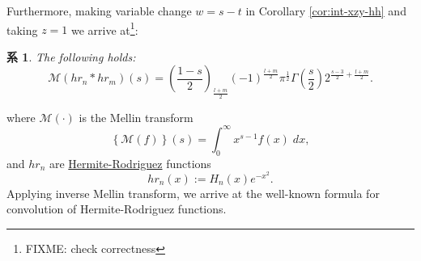 \documentclass[pdf,notes]{beamer}
\newtheorem{cor}{系}
\begin{document}
\begin{frame}
	Furthermore, making variable change $w=s-t$ in Corollary \ref{cor:int-xzy-hh} and taking $z=1$ we arrive at\footnote[frame]{FIXME: check correctness}:
	\begin{cor}
		The following holds:
		\begin{equation}
			\mathcal{M}(hr_n\ast hr_m)(s)=
			\left(  \frac{1-s}{2}\right)_{\frac{l + m}{2}} (- 1)^{\frac{l
			+ m}{2}}  \pi^{\frac{1}{2}} \Gamma \left( \frac{s}{2} \right)
			2^{\frac{s-3}{2} + \frac{l + m}{2}}.
			\label{eqn:mellin-hh}
		\end{equation}
	\end{cor}
	where $\mathcal{M}(\cdot)$ is the Mellin transform\begin{equation*}
		\left\{ \mathcal{M}(f) \right\}(s)=\int_0^\infty x^{s-1}f(x)\;dx,
	\end{equation*}
	and $hr_n$ are \underline{Hermite-Rodriguez} functions \cite{mackenzie2003hermite}
	\begin{equation*}
		hr_n(x):=H_n(x)e^{-x^2}.
	\end{equation*}
	Applying inverse Mellin transform, we arrive at the well-known formula for convolution of Hermite-Rodriguez functions.
\end{frame}
\end{document}
